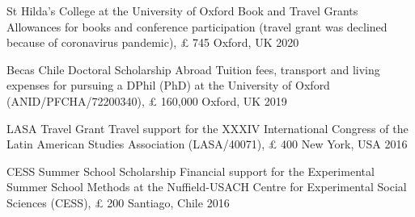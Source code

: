 





\vspace{1mm}

\begin{cvhonors}
\cvhonor
{St Hilda's College at the University of Oxford Book and Travel Grants} 
{Allowances for books and conference participation (travel grant was declined because of coronavirus pandemic), {\pounds} 745} 
{Oxford, UK}
{2020}
\end{cvhonors}

\vspace{1mm}

\begin{cvhonors}
\cvhonor
{Becas Chile Doctoral Scholarship Abroad} 
{Tuition fees, transport and living expenses for pursuing a DPhil (PhD) at the University of Oxford (ANID/PFCHA/72200340), {\pounds} 160,000}
{Oxford, UK}
{2019}
\end{cvhonors}

\vspace{1mm}

\begin{cvhonors}
\cvhonor
{LASA Travel Grant} 
{Travel support for the XXXIV International Congress of the Latin American Studies Association (LASA/40071), {\pounds} 400}
{New York, USA}
{2016}
\end{cvhonors}

\vspace{1mm}

\begin{cvhonors}
\cvhonor
{CESS Summer School Scholarship}
{Financial support for the Experimental Summer School Methods at the Nuffield-USACH Centre for Experimental Social Sciences (CESS), {\pounds} 200}
{Santiago, Chile}
{2016}
\end{cvhonors}

